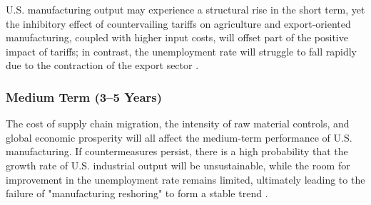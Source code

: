 \documentclass{apmcmthesis}
\begin{document}
U.S. manufacturing output may experience a structural rise in the short term, yet the inhibitory effect of countervailing tariffs on agriculture and export-oriented manufacturing, coupled with higher input costs, will offset part of the positive impact of tariffs; in contrast, the unemployment rate will struggle to fall rapidly due to the contraction of the export sector \cite{piie2025tariff}.

\subsubsection{Medium Term (3–5 Years)}

The cost of supply chain migration, the intensity of raw material controls, and global economic prosperity will all affect the medium-term performance of U.S. manufacturing. If countermeasures persist, there is a high probability that the growth rate of U.S. industrial output will be unsustainable, while the room for improvement in the unemployment rate remains limited, ultimately leading to the failure of "manufacturing reshoring" to form a stable trend \cite{worldbank2025prospects}.
\end{document}

